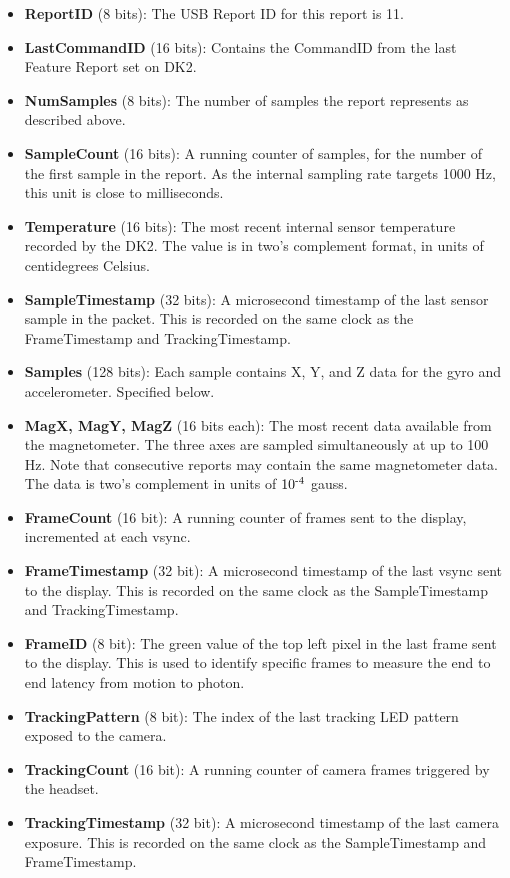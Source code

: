 \documentclass[letterpaper]{article}
\begin{document}
\begin{itemize}
  \item {\bfseries ReportID} (8 bits): The USB Report ID for this report is 11.
  \item {\bfseries LastCommandID} (16 bits): Contains the CommandID from the last Feature Report set on DK2.
  \item {\bfseries NumSamples} (8 bits): The number of samples the report represents as described above.
  \item {\bfseries SampleCount} (16 bits): A running counter of samples, for the number of the first sample in the report.  As the internal sampling rate targets 1000 Hz, this unit is close to milliseconds.
  \item {\bfseries Temperature} (16 bits): The most recent internal sensor temperature recorded by the DK2.  The value is in two's complement format, in units of centidegrees Celsius. 
  \item {\bfseries SampleTimestamp} (32 bits): A microsecond timestamp of the last sensor sample in the packet.  This is recorded on the same clock as the FrameTimestamp and TrackingTimestamp.
  \item {\bfseries Samples} (128 bits): Each sample contains X, Y, and Z data for the gyro and accelerometer.  Specified below.
  \item {\bfseries MagX, MagY, MagZ} (16 bits each): The most recent data available from the magnetometer.  The three axes are sampled simultaneously at up to 100 Hz.  Note that consecutive reports may contain the same magnetometer data.  The data is two's complement in units of $10\textsuperscript{-4}$ gauss.
  \item {\bfseries FrameCount} (16 bit): A running counter of frames sent to the display, incremented at each vsync.
  \item {\bfseries FrameTimestamp} (32 bit): A microsecond timestamp of the last vsync sent to the display.  This is recorded on the same clock as the SampleTimestamp and TrackingTimestamp.
  \item {\bfseries FrameID} (8 bit): The green value of the top left pixel in the last frame sent to the display.  This is used to identify specific frames to measure the end to end latency from motion to photon.
  \item {\bfseries TrackingPattern} (8 bit): The index of the last tracking LED pattern exposed to the camera.
  \item {\bfseries TrackingCount} (16 bit): A running counter of camera frames triggered by the headset.
  \item {\bfseries TrackingTimestamp} (32 bit): A microsecond timestamp of the last camera exposure.  This is recorded on the same clock as the SampleTimestamp and FrameTimestamp.
\end{itemize}
\end{document}
